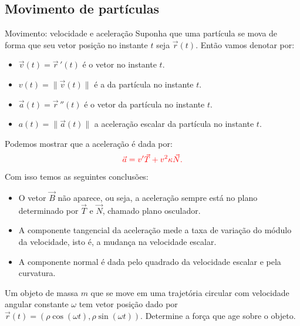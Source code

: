 %
%

\subsection*{Movimento de partículas}
\begin{frame}[label=fun-vet]{Movimento: velocidade e aceleração}
	Suponha que uma partícula se mova de forma que seu vetor posição no instante $t$ seja $\vec{r}(t)$. Então vamos denotar por:
	\begin{itemize}
		\item $\vec{v}(t)=\vec{r}\,'(t)$ é o vetor  no instante $t$.
		\item $v(t)=\|\vec{v}(t)\|$ é a  da partícula no instante $t$.
		\item $\vec{a}(t)=\vec{r}\,''(t)$ é o vetor  da partícula no instante $t$.
		\item $a(t)=\|\vec{a}(t)\|$ a aceleração escalar da partícula no instante $t$.
	\end{itemize}

\end{frame}


\begin{frame}[label=fun-vet]
Podemos mostrar que  a aceleração é dada por:
\[{\color{red}\vec{a}=v'\vec{T}+v^2\kappa \vec{N}. }\]
Com isso temos as seguintes conclusões:
\begin{itemize}
\item O vetor $\vec{B}$ não aparece, ou seja, a aceleração sempre está no plano determinado por $\vec{T}$ e $\vec{N}$, chamado {\color{blue} plano osculador}.


\item A componente tangencial da aceleração mede a taxa de variação do módulo da  velocidade, isto é, a mudança na velocidade escalar.

\item A componente normal é dada pelo quadrado da velocidade escalar e pela curvatura.
\end{itemize}

\begin{exe}
Um objeto de massa $m$ que se move em uma trajetória circular com velocidade angular constante $\omega$ tem vetor posição dado por $\vec{r}(t)=(\rho\cos (\omega t), \rho\sin (\omega t)).$ Determine a força que age sobre o objeto.
\end{exe}
\end{frame}


